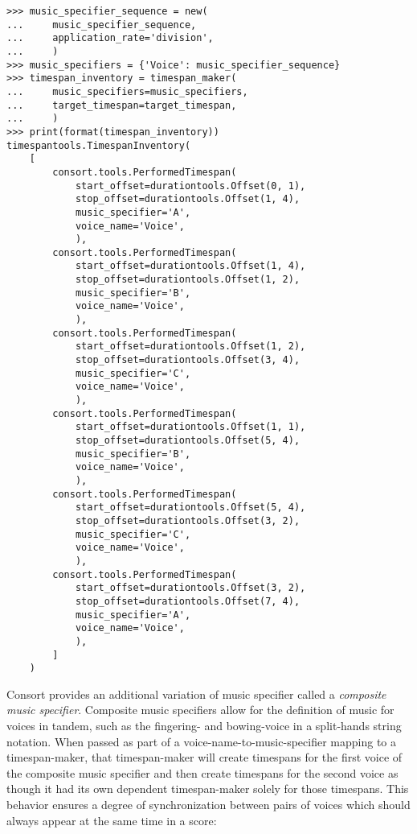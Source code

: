 \begin{abjadbookoutput}
\begin{singlespacing}
\vspace{-0.5\baselineskip}
\begin{verbatim}
>>> music_specifier_sequence = new(
...     music_specifier_sequence,
...     application_rate='division',
...     )
>>> music_specifiers = {'Voice': music_specifier_sequence}
>>> timespan_inventory = timespan_maker(
...     music_specifiers=music_specifiers,
...     target_timespan=target_timespan,
...     )
>>> print(format(timespan_inventory))
timespantools.TimespanInventory(
    [
        consort.tools.PerformedTimespan(
            start_offset=durationtools.Offset(0, 1),
            stop_offset=durationtools.Offset(1, 4),
            music_specifier='A',
            voice_name='Voice',
            ),
        consort.tools.PerformedTimespan(
            start_offset=durationtools.Offset(1, 4),
            stop_offset=durationtools.Offset(1, 2),
            music_specifier='B',
            voice_name='Voice',
            ),
        consort.tools.PerformedTimespan(
            start_offset=durationtools.Offset(1, 2),
            stop_offset=durationtools.Offset(3, 4),
            music_specifier='C',
            voice_name='Voice',
            ),
        consort.tools.PerformedTimespan(
            start_offset=durationtools.Offset(1, 1),
            stop_offset=durationtools.Offset(5, 4),
            music_specifier='B',
            voice_name='Voice',
            ),
        consort.tools.PerformedTimespan(
            start_offset=durationtools.Offset(5, 4),
            stop_offset=durationtools.Offset(3, 2),
            music_specifier='C',
            voice_name='Voice',
            ),
        consort.tools.PerformedTimespan(
            start_offset=durationtools.Offset(3, 2),
            stop_offset=durationtools.Offset(7, 4),
            music_specifier='A',
            voice_name='Voice',
            ),
        ]
    )
\end{verbatim}
\end{singlespacing}
\end{abjadbookoutput}

\noindent Consort provides an additional variation of music specifier called a
\emph{composite music specifier}.
Composite music specifiers allow for the definition of music for voices in
tandem, such as the fingering- and bowing-voice in a split-hands string
notation. When passed as part of a voice-name-to-music-specifier mapping to a
timespan-maker, that timespan-maker will create timespans for the first voice
of the composite music specifier and then create timespans for the second voice
as though it had its own dependent timespan-maker solely for those timespans.
This behavior ensures a degree of synchronization between pairs of voices which
should always appear at the same time in a score:

